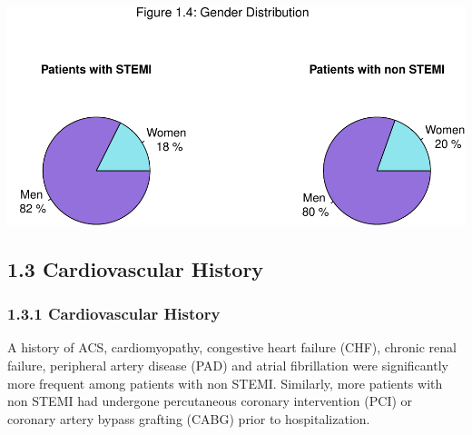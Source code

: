 \documentclass[
]{article}
\begin{document}
~

~

\includegraphics{ACSIS_2024_v1_pdf_files/figure-latex/unnamed-chunk-16-1.pdf}

\pagebreak

\subsection{1.3 Cardiovascular History}\label{cardiovascular-history}

\subsubsection{1.3.1 Cardiovascular
History}\label{cardiovascular-history-1}

A history of ACS, cardiomyopathy, congestive heart failure (CHF),
chronic renal failure, peripheral artery disease (PAD) and atrial
fibrillation were significantly more frequent among patients with non
STEMI. Similarly, more patients with non STEMI had undergone
percutaneous coronary intervention (PCI) or coronary artery bypass
grafting (CABG) prior to hospitalization.

~
\end{document}

